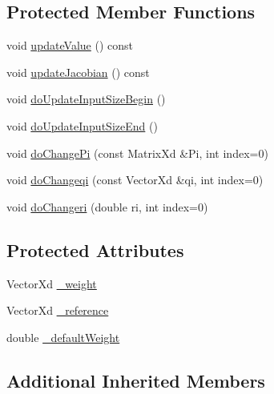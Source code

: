\subsection*{Protected Member Functions}
\begin{DoxyCompactItemize}
\item 
void \hyperlink{classocra_1_1WeightedSquareDistanceFunction_a42a0b3841574df7e06de5b572e4f405b}{update\+Value} () const 
\item 
void \hyperlink{classocra_1_1WeightedSquareDistanceFunction_a4a8a62d4fb706a2ee973a5477cb82f87}{update\+Jacobian} () const 
\item 
void \hyperlink{classocra_1_1WeightedSquareDistanceFunction_aff6adfc9daa9242233f58a8c2c16ba7d}{do\+Update\+Input\+Size\+Begin} ()
\item 
void \hyperlink{classocra_1_1WeightedSquareDistanceFunction_ab05ab6021a40ed308b7e0d67b5a55b82}{do\+Update\+Input\+Size\+End} ()
\item 
void \hyperlink{classocra_1_1WeightedSquareDistanceFunction_a2364e1c3908842eb252128256015d57b}{do\+Change\+Pi} (const Matrix\+Xd \&Pi, int index=0)
\item 
void \hyperlink{classocra_1_1WeightedSquareDistanceFunction_a0ba9644814cf959e34ffc581a6b1e37a}{do\+Changeqi} (const Vector\+Xd \&qi, int index=0)
\item 
void \hyperlink{classocra_1_1WeightedSquareDistanceFunction_afd6f2e03701395eed4db1b72588562ed}{do\+Changeri} (double ri, int index=0)
\end{DoxyCompactItemize}
\subsection*{Protected Attributes}
\begin{DoxyCompactItemize}
\item 
Vector\+Xd \hyperlink{classocra_1_1WeightedSquareDistanceFunction_a0363490acdf9ea0bbfc29e0721a757ed}{\+\_\+weight}
\item 
Vector\+Xd \hyperlink{classocra_1_1WeightedSquareDistanceFunction_a29e7d4c1ce99abef4f2196f11f0de9de}{\+\_\+reference}
\item 
double \hyperlink{classocra_1_1WeightedSquareDistanceFunction_a825041d63692b04a742c57dde4f80930}{\+\_\+default\+Weight}
\end{DoxyCompactItemize}
\subsection*{Additional Inherited Members}


